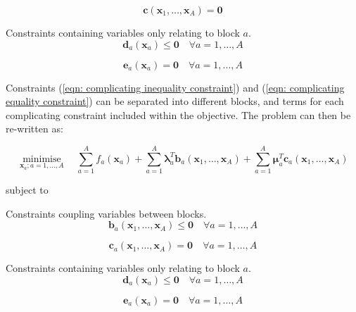 \documentclass{article}
\DeclareMathOperator*{\minimise}{minimise}
\begin{document}
\begin{equation}
	\bm{c}\left(\bm{x}_{1}, \ldots, \bm{x}_{A}\right) = \bm{0}
	\label{eqn: complicating equality constraint}
\end{equation}

Constraints containing variables only relating to block $a$.
\begin{equation}
	\bm{d}_{a}\left(\bm{x}_{a}\right) \leq \bm{0} \quad \forall a = 1,\ldots,A
\end{equation}

\begin{equation}
	\bm{e}_{a}\left(\bm{x}_{a}\right) = \bm{0} \quad \forall a = 1,\ldots,A
\end{equation}

Constraints (\ref{eqn: complicating inequality constraint}) and (\ref{eqn: complicating equality constraint}) can be separated into different blocks, and terms for each complicating constraint included within the objective. The problem can then be re-written as:

\begin{equation}
\minimise\limits_{\bm{x}_{a}; a=1,\ldots, A} \quad \sum\limits_{a=1}^{A}f_{a}(\bm{x}_{a}) + \sum\limits_{a=1}^{A}\bm{\lambda}^{T}_{a}\bm{b}_{a}\left(\bm{x}_{1},\ldots,\bm{x}_{A}\right) + \sum\limits_{a=1}^{A}\bm{\mu}^{T}_{a}\bm{c}_{a}\left(\bm{x}_{1},\ldots,\bm{x}_{A}\right)
\end{equation}

subject to

Constraints coupling variables between blocks.
\begin{equation}
\bm{b}_{a}\left(\bm{x}_{1}, \ldots, \bm{x}_{A}\right) \leq \bm{0} \quad \forall a = 1,\ldots,A
\end{equation}

\begin{equation}
\bm{c}_{a}\left(\bm{x}_{1}, \ldots, \bm{x}_{A}\right) = \bm{0} \quad \forall a = 1,\ldots,A
\end{equation}

Constraints containing variables only relating to block $a$.
\begin{equation}
\bm{d}_{a}\left(\bm{x}_{a}\right) \leq \bm{0} \quad \forall a = 1,\ldots,A
\end{equation}

\begin{equation}
\bm{e}_{a}\left(\bm{x}_{a}\right) = \bm{0} \quad \forall a = 1,\ldots,A
\end{equation}
\end{document}
